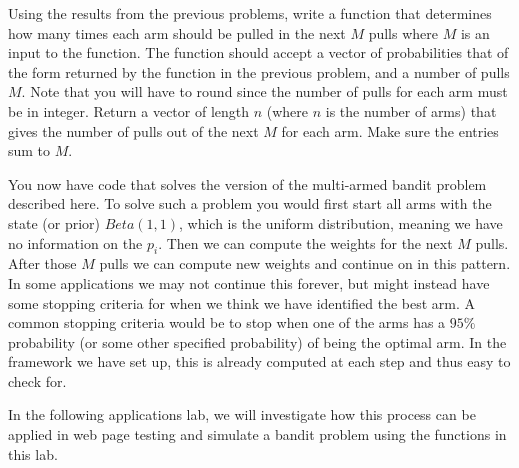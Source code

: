 \begin{problem}
Using the results from the previous problems, write a function that determines how many times each arm should be pulled in the next $M$ pulls where $M$ is an input to the function.  The function should accept a vector of probabilities that of the form returned by the function in the previous problem, and a number of pulls $M$.  Note that you will have to round since the number of pulls for each arm must be in integer.  Return a vector of length $n$ (where $n$ is the number of arms) that gives the number of pulls out of the next $M$ for each arm.  Make sure the entries sum to $M$.
\end{problem}

You now have code that solves the version of the multi-armed bandit problem described here.  To solve such a problem you would first start all arms with the state (or prior) $Beta(1,1)$, which is the uniform distribution, meaning we have no information on the $p_i$.  Then we can compute the weights for the next $M$ pulls.  After those $M$ pulls we can compute new weights and continue on in this pattern.  In some applications we may not continue this forever, but might instead have some stopping criteria for when we think we have identified the best arm.  A common stopping criteria would be to stop when one of the arms has a $95\%$ probability (or some other specified probability) of being the optimal arm.  In the framework we have set up, this is already computed at each step and thus easy to check for.

In the following applications lab, we will investigate how this process can be applied in web page testing and simulate a bandit problem using the functions in this lab.